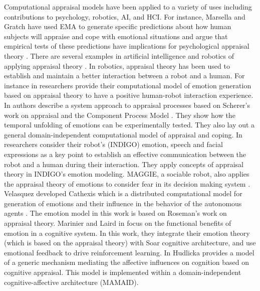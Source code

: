 \documentclass[12pt]{report}
\begin{document}
Computational appraisal models have been applied to a variety of uses including
contributions to psychology, robotics, AI, and HCI. For instance, Marsella and
Gratch have used EMA \cite{marsella:ema-process-model} to generate specific
predictions about how human subjects will appraise and cope with emotional
situations and argue that empirical tests of these predictions have implications
for psychological appraisal theory \cite{gratch:assessing-appraisal}
\cite{marsella:assessing-coping}. There are several examples in artificial
intelligence and robotics of applying appraisal theory
\cite{adam:bdi-emotional-companion} \cite{kim:model-hri-appraisal}
\cite{marsella:ema-process-model}. In robotics, appraisal theory has been used
to establish and maintain a better interaction between a robot and a human. For
instance in \cite{kim:model-hri-appraisal} researchers provide their
computational model of emotion generation based on appraisal theory to have a
positive human-robot interaction experience. In
\cite{sander:systems-approach-appraisal} authors describe a system approach to
appraisal processes based on Scherer's work on appraisal and the Component
Process Model \cite{scherer:nature-function-emotion}. They show how the
temporal unfolding of emotions can be experimentally tested. They also lay out a
general domain-independent computational model of appraisal and coping. In
\cite{vogiatzis:robot-museum} researchers consider their robot's (INDIGO)
emotion, speech and facial expressions as a key point to establish an effective
communication between the robot and a human during their interaction. They apply
concepts of appraisal theory in INDIGO's emotion modeling. MAGGIE, a sociable
robot, also applies the appraisal theory of emotions to consider fear in its
decision making system \cite{castro:autonomous-robot-fear}. Velasquez developed
Cathexis which is a distributed computational model for generation of emotions
and their influence in the behavior of the autonomous agents
\cite{velasquez:emotions-motivations-agents}. The emotion model in this work is
based on Roseman's work on appraisal theory. Marinier and Laird in
\cite{marinier:emotion-reinforcement} focus on the functional benefits of
emotion in a cognitive system. In this work, they integrate their emotion theory
(which is based on the appraisal theory) with Soar cognitive architecture, and
use emotional feedback to drive reinforcement learning. In
\cite{hudlicka:emotinos-reasons} Hudlicka provides a model of a generic
mechanism mediating the affective influences on cognition based on cognitive
appraisal. This model is implemented within a domain-independent
cognitive-affective architecture (MAMAID).
\end{document}
